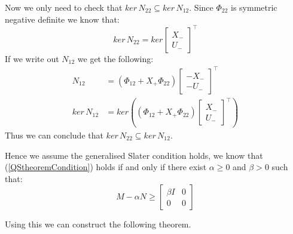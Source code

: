 Now we only need to check that $ker \, N_{22} \subseteq ker \, N_{12}$. Since $\Phi_{22}$ is symmetric negative definite we know that:
\[ ker \, N_{22} = ker \begin{bmatrix} X_- \\ U_- \end{bmatrix}^\top \]
If we write out $N_{12}$ we get the following:
\begin{align*}
	 N_{12} &= (\Phi_{12} + X_+ \Phi_{22}) \begin{bmatrix} -X_- \\ -U_- \end{bmatrix}^\top \\
	 ker \, N_{12} &= ker \left( (\Phi_{12} + X_+ \Phi_{22}) \begin{bmatrix} X_- \\ U_- \end{bmatrix}^\top \right)
\end{align*}
Thus we can conclude that $ker \, N_{22} \subseteq ker \, N_{12}$. 

Hence we assume the generalised Slater condition holds, we know that (\ref{QStheoremCondition}) holds if and only if there exist $\alpha \geq 0$ and $\beta > 0$ such that:
\begin{equation*}
	M - \alpha N \geq \begin{bmatrix} \beta I & 0 \\ 0 & 0 \end{bmatrix}
\end{equation*}

Using this we can construct the following theorem.

